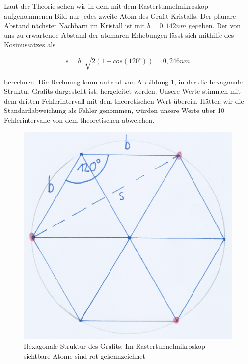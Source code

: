 \documentclass[10pt,a4paper]{article}
\begin{document}
Laut der Theorie sehen wir in dem mit dem Rastertunnelmikroskop aufgenommenen Bild nur jedes zweite Atom des Grafit-Kristalls. Der planare Abstand nächster Nachbarn im Kristall ist mit $b = 0,142 nm$ gegeben. Der von uns zu erwartende Abstand der atomaren Erhebungen lässt sich mithilfe des Kosinussatzes als 

\begin{equation}
	s = b \cdot \sqrt{2(1-cos(120^\circ))} = 0,246 nm
	\label{eq:aabstand}
\end{equation}

berechnen. Die Rechnung kann anhand von Abbildung \ref{rechnungatomabstand}, in der die hexagonale Struktur Grafits dargestellt ist, hergeleitet werden. Unsere Werte stimmen mit dem dritten Fehlerintervall mit dem theoretischen Wert überein. Hätten wir die Standardabweichung als Fehler genommen, würden unsere Werte über 10 Fehlerintervalle von dem theoretischen abweichen.

\begin{figure}[h]
	\centering
	
	\includegraphics[scale = 0.4]{hexagon.jpg}
	
	\caption{Hexagonale Struktur des Grafits: Im Rastertunnelmikroskop sichtbare Atome sind rot gekennzeichnet}
	\label{rechnungatomabstand}
\end{figure}
\end{document}
